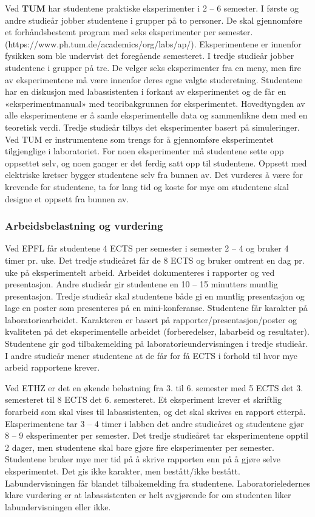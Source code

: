 \documentclass{article}
\begin{document}
Ved \textbf{TUM} har studentene praktiske eksperimenter i 2 – 6 semester. I første og andre studieår jobber studentene i grupper på to personer. De skal gjennomføre et forhåndsbestemt program med seks eksperimenter per semester. (https://www.ph.tum.de/academics/org/labs/ap/). Eksperimentene er innenfor fysikken som ble undervist det foregående semesteret. 
I tredje studieår jobber studentene i grupper på tre. De velger seks eksperimenter fra en meny, men fire av eksperimentene må være innenfor deres egne valgte studeretning. Studentene har en diskusjon med labassistenten i forkant av eksperimentet og de får en «eksperimentmanual» med teoribakgrunnen for eksperimentet. Hovedtyngden av alle eksperimentene er å samle eksperimentelle data og sammenlikne dem med en teoretisk verdi. Tredje studieår tilbys det eksperimenter basert på simuleringer. 
Ved TUM er instrumentene som trengs for å gjennomføre eksperimentet tilgjenglige i laboratoriet. For noen eksperimenter må studentene sette opp oppsettet selv, og noen ganger er det ferdig satt opp til studentene. Oppsett med elektriske kretser bygger studentene selv fra bunnen av. Det vurderes å være for krevende for studentene, ta for lang tid og koste for mye om studentene skal designe et oppsett fra bunnen av. 

\subsubsection{Arbeidsbelastning og vurdering}
Ved EPFL får studentene 4 ECTS per semester i semester 2 – 4 og bruker 4 timer pr. uke. Det tredje studieåret får de 8 ECTS og bruker omtrent en dag pr. uke på eksperimentelt arbeid. Arbeidet dokumenteres i rapporter og ved presentasjon. Andre studieår gir studentene en 10 – 15 minutters muntlig presentasjon. Tredje studieår skal studentene både gi en muntlig presentasjon og lage en poster som presenteres på en mini-konferanse. Studentene får karakter på laboratoriearbeidet. Karakteren er basert på rapporter/presentasjon/poster og kvaliteten på det eksperimentelle arbeidet (forberedelser, labarbeid og resultater). 
Studentene gir god tilbakemelding på laboratorieundervisningen i tredje studieår. I andre studieår mener studentene at de får for få ECTS i forhold til hvor mye arbeid rapportene krever. 

Ved ETHZ er det en økende belastning fra 3. til 6. semester med 5 ECTS det 3. semesteret til 8 ECTS det 6. semesteret. Et eksperiment krever et skriftlig forarbeid som skal vises til labassistenten, og det skal skrives en rapport etterpå. Eksperimentene tar 3 – 4 timer i labben det andre studieåret og studentene gjør 8 – 9 eksperimenter per semester. Det tredje studieåret tar eksperimentene opptil 2 dager, men studentene skal bare gjøre fire eksperimenter per semester. Studentene bruker mye mer tid på å skrive rapporten enn på å gjøre selve eksperimentet. 
Det gis ikke karakter, men bestått/ikke bestått. Labundervisningen får blandet tilbakemelding fra studentene. Laboratorieledernes klare vurdering er at labassistenten er helt avgjørende for om studenten liker labundervisningen eller ikke.  
\end{document}
